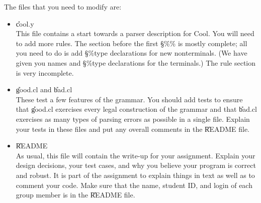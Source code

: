 The files that you need to modify are:
\begin{itemize}

\item \U{cool.y} \\
This file contains a start towards a parser description for Cool.
You will need to add more rules.
The section before the first \S{\%\%} is mostly complete;
all you need to do is add \S{\%type} declarations for new nonterminals.
(We have given you names and \S{\%type} declarations for the terminals.)
The rule section is very incomplete.

\item \U{good.cl} and \U{bad.cl} \\
These test a few features of the grammar.  You should add tests to
ensure that \U{good.cl} exercises every legal construction of the
grammar and that \U{bad.cl} exercises as many types of parsing errors
as possible in a single file.  Explain your tests in these files and
put any overall comments in the \U{README} file.

\item \U{README} \\
As usual, 
this file will contain the write-up for your assignment.
Explain your design decisions, your test cases, and why you believe your
program is correct and robust.
It is part of the assignment to explain things in text as well as to
comment your code.
Make sure that the name, student ID, and login of each
group member is in the \U{README} file.
\end{itemize}%


